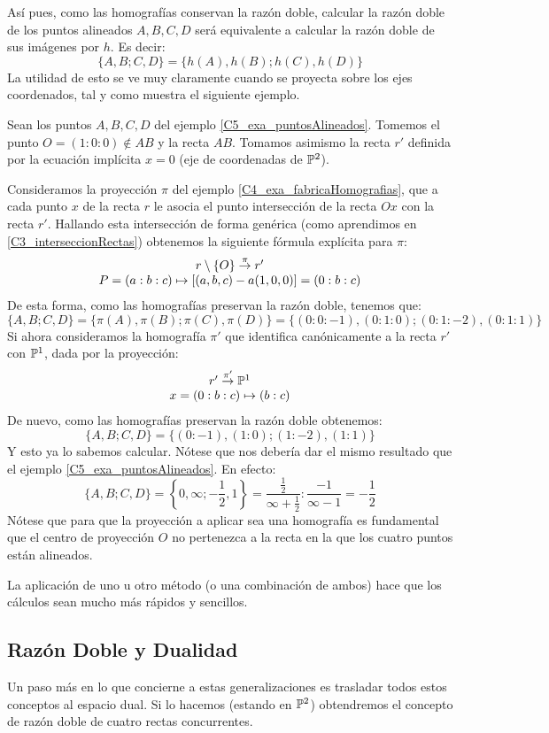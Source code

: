 Así pues, como las homografías conservan la razón doble, calcular la razón doble de los puntos alineados $A,B,C,D$ será equivalente a calcular la razón doble de sus imágenes por $h$. Es decir:
\[\{A,B;C,D\}=\{h(A),h(B);h(C),h(D)\}\]
La utilidad de esto se ve muy claramente cuando se proyecta sobre los ejes coordenados, tal y como muestra el siguiente ejemplo.
\begin{exa}
	Sean los puntos $A,B,C,D$ del ejemplo \ref{C5_exa_puntosAlineados}. Tomemos el punto $O=(1:0:0)\not\in AB$ y la recta $AB$. Tomamos asimismo la recta $r'$ definida por la ecuación implícita $x=0$ (eje de coordenadas de $\mathbb{P}^2$).
	
	Consideramos la proyección $\pi$ del ejemplo \ref{C4_exa_fabricaHomografias}, que a cada punto $x$ de la recta $r$ le asocia el punto intersección de la recta $Ox$ con la recta $r'$. Hallando esta intersección de forma genérica (como aprendimos en \ref{C3_interseccionRectas}) obtenemos la siguiente fórmula explícita para $\pi$:
	\[\begin{array}{c}
	r\setminus\{O\}\stackrel{\pi}{\to} r'\\
	P=(a:b:c)\mapsto\left [ (a,b,c)-a(1,0,0) \right ]=(0:b:c)
	\end{array}\]
	De esta forma, como las homografías preservan la razón doble, tenemos que:
	\[\{A,B;C,D\}=\{\pi(A),\pi(B);\pi(C),\pi(D)\}=\{(0:0:-1),(0:1:0);(0:1:-2),(0:1:1)\}\]
	Si ahora consideramos la homografía $\pi'$ que identifica canónicamente a la recta $r'$ con $\mathbb{P}^1$, dada por la proyección:
	\[\begin{array}{c}
	r'\stackrel{\pi'}{\to}\mathbb{P}^1\\
	x=(0:b:c)\mapsto(b:c)
	\end{array}\]
	De nuevo, como las homografías preservan la razón doble obtenemos:
	\[\{A,B;C,D\}=\{(0:-1),(1:0);(1:-2),(1:1)\}\]
	Y esto ya lo sabemos calcular. Nótese que nos debería dar el mismo resultado que el ejemplo \ref{C5_exa_puntosAlineados}. En efecto:
	\[\{A,B;C,D\}=\left\{0,\infty;-\frac{1}{2},1\right\}=\frac{\frac{1}{2}}{\infty+\frac{1}{2}}:\frac{-1}{\infty-1}=-\frac{1}{2}\]
	Nótese que para que la proyección a aplicar sea una homografía es fundamental que el centro de proyección $O$ no pertenezca a la recta en la que los cuatro puntos están alineados.
\end{exa}

La aplicación de uno u otro método (o una combinación de ambos) hace que los cálculos sean mucho más rápidos y sencillos.
\subsection{Razón Doble y Dualidad}
Un paso más en lo que concierne a estas generalizaciones es trasladar todos estos conceptos al espacio dual. Si lo hacemos (estando en $\mathbb{P}^2$) obtendremos el concepto de razón doble de cuatro rectas concurrentes.

